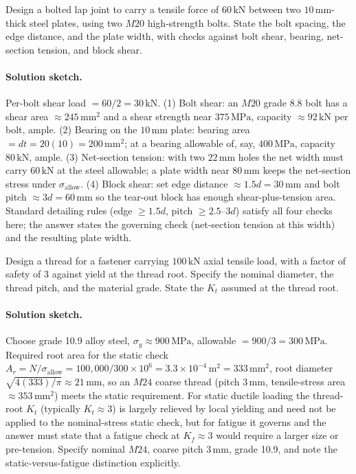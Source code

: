 \begin{exercise}
Design a bolted lap joint to carry a tensile force of $60\,\text{kN}$
between two $10\,\si{\milli\meter}$-thick steel plates, using two
$M20$ high-strength bolts. State the bolt spacing, the edge distance,
and the plate width, with checks against bolt shear, bearing, net-
section tension, and block shear.
\paragraph{Solution sketch.} Per-bolt shear load $= 60/2 = 30\,\text{
kN}$. (1) Bolt shear: an $M20$ grade 8.8 bolt has a shear area $\approx
245\,\si{\milli\meter}^2$ and a shear strength near $375\,\text{MPa}$,
capacity $\approx 92\,\text{kN}$ per bolt, ample. (2) Bearing on the
$10\,\si{\milli\meter}$ plate: bearing area $= d t = 20(10) = 200\,\si{
\milli\meter}^2$; at a bearing allowable of, say, $400\,\text{MPa}$,
capacity $80\,\text{kN}$, ample. (3) Net-section tension: with two
$22\,\si{\milli\meter}$ holes the net width must carry $60\,\text{kN}$
at the steel allowable; a plate width near $80\,\si{\milli\meter}$ keeps
the net-section stress under $\sigma_{\text{allow}}$. (4) Block shear:
set edge distance $\approx 1.5 d = 30\,\si{\milli\meter}$ and bolt
pitch $\approx 3 d = 60\,\si{\milli\meter}$ so the tear-out block has
enough shear-plus-tension area. Standard detailing rules (edge $\geq
1.5d$, pitch $\geq 2.5$--$3d$) satisfy all four checks here; the answer
states the governing check (net-section tension at this width) and the
resulting plate width.
\end{exercise}

\begin{exercise}
Design a thread for a fastener carrying $100\,\text{kN}$ axial tensile
load, with a factor of safety of $3$ against yield at the thread
root. Specify the nominal diameter, the thread pitch, and the
material grade. State the $K_t$ assumed at the thread root.
\paragraph{Solution sketch.} Choose grade 10.9 alloy steel, $\sigma_y
\approx 900\,\text{MPa}$, allowable $= 900/3 = 300\,\text{MPa}$.
Required root area for the static check $A_r = N/\sigma_{\text{allow}} =
100{,}000/300\times 10^6 = 3.3\times 10^{-4}\,\si{\meter}^2 = 333\,\si{
\milli\meter}^2$, root diameter $\sqrt{4(333)/\pi} \approx 21\,\si{
\milli\meter}$, so an $M24$ coarse thread (pitch $3\,\si{\milli\meter}$,
tensile-stress area $\approx 353\,\si{\milli\meter}^2$) meets the static
requirement. For static ductile loading the thread-root $K_t$
(typically $K_t \approx 3$) is largely relieved by local yielding and
need not be applied to the nominal-stress static check, but for fatigue
it governs and the answer must state that a fatigue check at $K_f
\approx 3$ would require a larger size or pre-tension. Specify nominal
$M24$, coarse pitch $3\,\si{\milli\meter}$, grade 10.9, and note the
static-versus-fatigue distinction explicitly.
\end{exercise}

